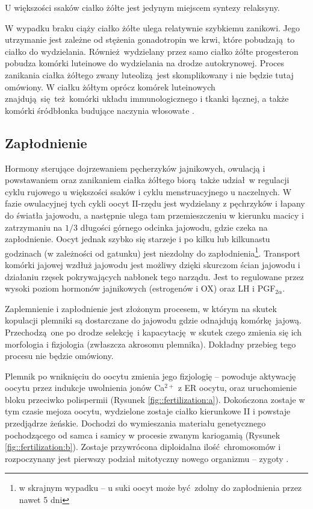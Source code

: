 \documentclass[two column, twoside, a4paper]{article}
\begin{document}
U większości ssaków ciałko żółte jest jedynym miejscem syntezy relaksyny.

W wypadku braku ciąży ciałko żółte ulega relatywnie szybkiemu zanikowi. Jego utrzymanie jest zależne od stężenia gonadotropin we krwi, które pobudzają to ciałko do wydzielania. Również wydzielany przez samo ciałko żółte progesteron pobudza komórki luteinowe do wydzielania na drodze autokrynowej. Proces zanikania ciałka żółtego zwany luteolizą jest skomplikowany i nie będzie tutaj omówiony.
W ciałku żółtym oprócz komórek luteinowych znajdują się też komórki układu immunologicznego i tkanki łącznej, a także komórki śródbłonka budujące naczynia włosowate \autocite{Krzymowski2005, Sawicki2017}.

\subsection{Zapłodnienie}

Hormony sterujące dojrzewaniem pęcherzyków jajnikowych, owulacją i powstawaniem oraz zanikaniem ciałka żółtego biorą także udział w regulacji cyklu rujowego u większości ssaków i cyklu menstruacyjnego u naczelnych. W fazie owulacyjnej tych cykli oocyt II-rzędu jest wydzielany z pęchrzyków i łapany do światła jajowodu, a następnie ulega tam przemieszczeniu w kierunku macicy i zatrzymaniu na $1/3$ długości górnego odcinka jajowodu, gdzie czeka na zapłodnienie. Oocyt jednak szybko się starzeje i po kilku lub kilkunastu godzinach (w zależności od gatunku) jest niezdolny do zapłodnienia\footnote{w skrajnym wypadku -- u suki oocyt może być zdolny do zapłodnienia przez nawet 5 dni}. Transport komórki jajowej wzdłuż jajowodu jest możliwy dzięki skurczom ścian jajowodu i działaniu rzęsek pokrywających nabłonek tego narządu. Jest to regulowane przez wysoki poziom hormonów jajnikowych (estrogenów i OX) oraz LH i PGF$_{2\alpha}$. \autocite{Krzymowski2005}

Zaplemnienie i zapłodnienie jest złożonym procesem, w którym na skutek kopulacji plemniki są dostarczane do jajowodu gdzie odnajdują komórkę jajową. Przechodzą one po drodze selekcję i kapacytację w skutek czego zmienia się ich morfologia i fizjologia (zwłaszcza akrosomu plemnika). Dokładny przebieg tego procesu nie będzie omówiony.

Plemnik po wniknięciu do oocytu zmienia jego fizjologię -- powoduje aktywację oocytu przez indukcje uwolnienia jonów Ca$^{2+}$ z ER oocytu, oraz uruchomienie bloku przeciwko polispermii (Rysunek \ref{fig::fertilization:a}). Dokończona zostaje w tym czasie mejoza oocytu, wydzielone zostaje ciałko kierunkowe II i powstaje przedjądrze żeńskie. Dochodzi do wymieszania materiału genetycznego pochodzącego od samca i samicy w procesie zwanym kariogamią (Rysunek \ref{fig::fertilization:b}). Zostaje przywrócona diploidalna ilość chromosomów i rozpoczynany jest pierwszy podział mitotyczny nowego organizmu -- zygoty \autocite{Krzymowski2005, Bielanska2001}.
\end{document}
